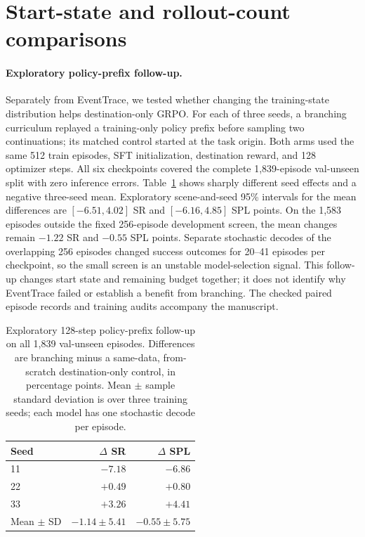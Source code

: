 \documentclass[10pt,twocolumn,letterpaper]{article}
\begin{document}
\section{Start-state and rollout-count comparisons}
\label{sec:start-followups}
\paragraph{Exploratory policy-prefix follow-up.} Separately from EventTrace, we tested whether changing the training-state distribution helps destination-only GRPO. For each of three seeds, a branching curriculum replayed a training-only policy prefix before sampling two continuations; its matched control started at the task origin. Both arms used the same 512 train episodes, SFT initialization, destination reward, and 128 optimizer steps. All six checkpoints covered the complete 1,839-episode val-unseen split with zero inference errors. Table~\ref{tab:branch-followup} shows sharply different seed effects and a negative three-seed mean. Exploratory scene-and-seed 95\% intervals for the mean differences are $[-6.51,4.02]$ SR and $[-6.16,4.85]$ SPL points. On the 1,583 episodes outside the fixed 256-episode development screen, the mean changes remain $-1.22$ SR and $-0.55$ SPL points. Separate stochastic decodes of the overlapping 256 episodes changed success outcomes for 20--41 episodes per checkpoint, so the small screen is an unstable model-selection signal. This follow-up changes start state and remaining budget together; it does not identify why EventTrace failed or establish a benefit from branching. The checked paired episode records and training audits accompany the manuscript.

\begin{table}[t]
\centering
\caption{Exploratory 128-step policy-prefix follow-up on all 1,839 val-unseen episodes. Differences are branching minus a same-data, from-scratch destination-only control, in percentage points. Mean $\pm$ sample standard deviation is over three training seeds; each model has one stochastic decode per episode.}
\label{tab:branch-followup}
\footnotesize
\begin{tabular}{lrr}
\toprule
Seed & $\Delta$ SR & $\Delta$ SPL \\
\midrule
11 & $-7.18$ & $-6.86$ \\
22 & $+0.49$ & $+0.80$ \\
33 & $+3.26$ & $+4.41$ \\
Mean $\pm$ SD & $-1.14\pm5.41$ & $-0.55\pm5.75$ \\
\bottomrule
\end{tabular}
\end{table}
\end{document}

